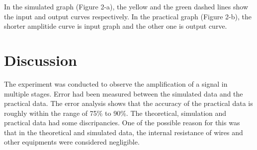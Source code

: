 \documentclass[12pt]{article}
\begin{document}
In the simulated graph (Figure 2-a), the yellow and the green dashed lines show the input and output curves respectively. In the practical graph (Figure 2-b), the shorter amplitide curve is input graph and the other one is output curve.


\section{Discussion}
The experiment was conducted to observe the amplification of a signal in multiple stages. Error had been measured between the simulated data and the practical data. The error analysis shows that the accuracy of the practical data is roughly within the range of 75\% to 90\%. The theoretical, simulation and practical data had some discripancies. One of the possible reason for this was that in the theoretical and simulated data, the internal resistance of wires and other equipments were considered negligible.
\end{document}
